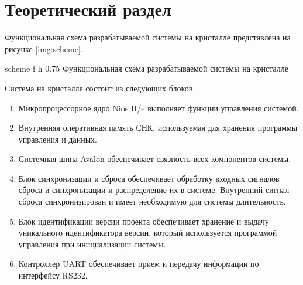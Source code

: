 \chapter{Теоретический раздел}

Функциональная схема разрабатываемой системы на кристалле представлена на рисунке \ref{img:scheme}.

{scheme} %
{f} %
{h} %
{0.75\textwidth} %
{Функциональная схема разрабатываемой системы на кристалле} %

Система на кристалле состоит из следующих блоков.

\begin{enumerate}
    \item Микропроцессорное ядро Nios II/e выполняет функции управления системой.
    \item Внутренняя оперативная память СНК, используемая для хранения программы
    управления и данных.
    \item Системная шина Avalon обеспечивает связность всех компонентов системы.
    \item Блок синхронизации и сброса обеспечивает обработку входных сигналов сброса и
    синхронизации и распределение их в системе. Внутренний сигнал сброса
    синхронизирован и имеет необходимую для системы длительность.
    \item Блок идентификации версии проекта обеспечивает хранение и выдачу уникального
    идентификатора версии, который используется программой управления при
    инициализации системы.
    \item Контроллер UART обеспечивает прием и передачу информации по интерфейсу RS232.
\end{enumerate}

\clearpage
